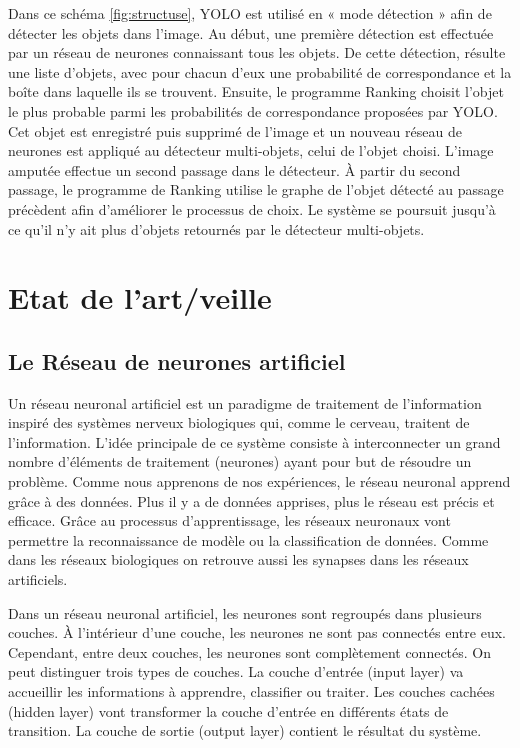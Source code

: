 \documentclass[debug,nodate,hideweeklyreports]{polytech/polytech}
\begin{document}
Dans ce schéma \autoref{fig:structuse}, YOLO est utilisé en « mode détection » afin de détecter les objets dans l’image. Au début, une première détection est effectuée par un réseau de neurones connaissant tous les objets. De cette détection, résulte une liste d’objets, avec pour chacun d’eux une probabilité de correspondance et la boîte dans laquelle ils se trouvent. Ensuite, le programme Ranking choisit l’objet le plus probable parmi les probabilités de correspondance proposées par YOLO. Cet objet est enregistré puis supprimé de l’image et un nouveau réseau de neurones est appliqué au détecteur multi-objets, celui de l’objet choisi. L’image amputée effectue un second passage dans le détecteur. À partir du second passage, le programme de Ranking utilise le graphe de l’objet détecté au passage précèdent afin d’améliorer le processus de choix. Le système se poursuit jusqu’à ce qu’il n’y ait plus d’objets retournés par le détecteur multi-objets.

\chapter{Etat de l'art/veille}
\section{Le Réseau de neurones artificiel}

Un réseau neuronal artificiel est un paradigme de traitement de l’information inspiré des systèmes nerveux biologiques qui, comme le cerveau, traitent de l’information. L'idée principale de ce système consiste à interconnecter un grand nombre d’éléments de traitement (neurones) ayant pour but de résoudre un problème. Comme nous apprenons de nos expériences, le réseau neuronal apprend grâce à des données. Plus il y a de données apprises, plus le réseau est précis et efficace. Grâce au processus d’apprentissage, les réseaux neuronaux vont permettre la reconnaissance de modèle ou la classification de données. Comme dans les réseaux biologiques on retrouve aussi les synapses dans les réseaux artificiels.

Dans un réseau neuronal artificiel, les neurones sont regroupés dans plusieurs couches. À l’intérieur d’une couche, les neurones ne sont pas connectés entre eux. Cependant, entre deux couches, les neurones sont complètement connectés. On peut distinguer trois types de couches. La couche d’entrée (input layer) va accueillir les informations à apprendre, classifier ou traiter. Les couches cachées (hidden layer) vont transformer la couche d’entrée en différents états de transition. La couche de sortie (output layer) contient le résultat du système.
\end{document}
